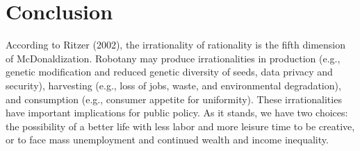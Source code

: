 \section{Conclusion} 
According to Ritzer (2002), the irrationality of rationality is the fifth dimension of McDonaldization. Robotany may produce irrationalities in production (e.g., genetic modification and reduced genetic diversity of seeds, data privacy and security), harvesting (e.g., loss of jobs, waste, and environmental degradation), and consumption (e.g., consumer appetite for uniformity). These irrationalities have important implications for public policy. As it stands, we have two choices: the possibility of a better life with less labor and more leisure time to be creative, or to face mass unemployment and continued wealth and income inequality.




